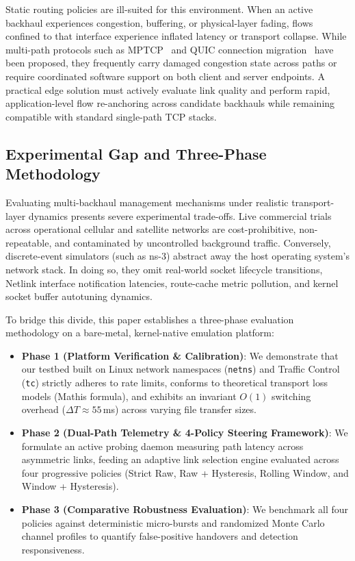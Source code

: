 \documentclass[conference]{IEEEtran}
\begin{document}
Static routing policies are ill-suited for this environment. When an active backhaul experiences congestion, buffering, or physical-layer fading, flows confined to that interface experience inflated latency or transport collapse. While multi-path protocols such as MPTCP~\cite{rfc8684_mptcp} and QUIC connection migration~\cite{de2020mptcp} have been proposed, they frequently carry damaged congestion state across paths or require coordinated software support on both client and server endpoints. A practical edge solution must actively evaluate link quality and perform rapid, application-level flow re-anchoring across candidate backhauls while remaining compatible with standard single-path TCP stacks.

\subsection{Experimental Gap and Three-Phase Methodology}
Evaluating multi-backhaul management mechanisms under realistic transport-layer dynamics presents severe experimental trade-offs. Live commercial trials across operational cellular and satellite networks are cost-prohibitive, non-repeatable, and contaminated by uncontrolled background traffic. Conversely, discrete-event simulators (such as ns-3) abstract away the host operating system's network stack. In doing so, they omit real-world socket lifecycle transitions, Netlink interface notification latencies, route-cache metric pollution, and kernel socket buffer autotuning dynamics.

To bridge this divide, this paper establishes a three-phase evaluation methodology on a bare-metal, kernel-native emulation platform:
\begin{itemize}
    \item \textbf{Phase 1 (Platform Verification \& Calibration)}: We demonstrate that our testbed built on Linux network namespaces (\texttt{netns}) and Traffic Control (\texttt{tc}) strictly adheres to rate limits, conforms to theoretical transport loss models (Mathis formula), and exhibits an invariant $O(1)$ switching overhead ($\Delta T \approx 55$\,ms) across varying file transfer sizes.
    \item \textbf{Phase 2 (Dual-Path Telemetry \& 4-Policy Steering Framework)}: We formulate an active probing daemon measuring path latency across asymmetric links, feeding an adaptive link selection engine evaluated across four progressive policies (Strict Raw, Raw + Hysteresis, Rolling Window, and Window + Hysteresis).
    \item \textbf{Phase 3 (Comparative Robustness Evaluation)}: We benchmark all four policies against deterministic micro-bursts and randomized Monte Carlo channel profiles to quantify false-positive handovers and detection responsiveness.
\end{itemize}
\end{document}
